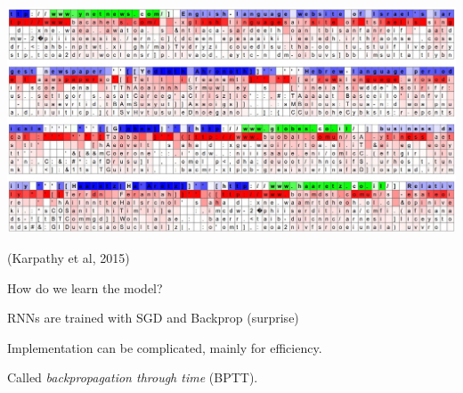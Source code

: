\documentclass{beamer}
\let\tempone\itemize
\let\temptwo\enditemize
\renewenvironment{itemize}{\tempone\addtolength{\itemsep}{0.5\baselineskip}}{\temptwo}
\newcommand{\air}{\vspace{0.25cm}}
\begin{document}
\begin{frame}
  \begin{center}
    \includegraphics[width=\textwidth]{lstm1}


    {\footnotesize (Karpathy et al, 2015)}
  \end{center}
\end{frame}

\begin{frame}{How do we learn the model?}
  \begin{itemize}
  \item RNNs are trained with SGD and Backprop (surprise)
    \air 

  \item Implementation can be complicated, mainly for efficiency.
    \air

  \item Called \textit{backpropagation through time} (BPTT).
  \end{itemize}
\end{frame}



\end{document}
